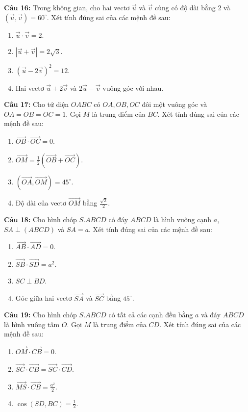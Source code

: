 \documentclass[12pt]{article}
\begin{document}
	\vspace{0.2cm}
	\noindent \textbf{Câu 16:} Trong không gian, cho hai vectơ $\vec{u}$ và $\vec{v}$ cùng có độ dài bằng $2$ và $(\vec{u}, \vec{v}) = 60^\circ$. Xét tính đúng sai của các mệnh đề sau:
	\begin{enumerate}[label=\alph*)]
		\item $\vec{u} \cdot \vec{v} = 2$.
		\item $|\vec{u} + \vec{v}| = 2\sqrt{3}$.
		\item $(\vec{u} - 2\vec{v})^2 = 12$.
		\item Hai vectơ $\vec{u} + 2\vec{v}$ và $2\vec{u} - \vec{v}$ vuông góc với nhau.
	\end{enumerate}
	
	\vspace{0.2cm}
	\noindent \textbf{Câu 17:} Cho tứ diện $OABC$ có $OA, OB, OC$ đôi một vuông góc và $OA = OB = OC = 1$. Gọi $M$ là trung điểm của $BC$. Xét tính đúng sai của các mệnh đề sau:
	\begin{enumerate}[label=\alph*)]
		\item $\overrightarrow{OB} \cdot \overrightarrow{OC} = 0$.
		\item $\overrightarrow{OM} = \frac{1}{2}(\overrightarrow{OB} + \overrightarrow{OC})$.
		\item $(\overrightarrow{OA}, \overrightarrow{OM}) = 45^\circ$.
		\item Độ dài của vectơ $\overrightarrow{OM}$ bằng $\frac{\sqrt{2}}{2}$.
	\end{enumerate}
	
	\vspace{0.2cm}
	\noindent \textbf{Câu 18:} Cho hình chóp $S.ABCD$ có đáy $ABCD$ là hình vuông cạnh $a$, $SA \perp (ABCD)$ và $SA = a$. Xét tính đúng sai của các mệnh đề sau:
	\begin{enumerate}[label=\alph*)]
		\item $\overrightarrow{AB} \cdot \overrightarrow{AD} = 0$.
		\item $\overrightarrow{SB} \cdot \overrightarrow{SD} = a^2$.
		\item $SC \perp BD$.
		\item Góc giữa hai vectơ $\overrightarrow{SA}$ và $\overrightarrow{SC}$ bằng $45^\circ$.
	\end{enumerate}
	
	\noindent \textbf{Câu 19:} Cho hình chóp $S.ABCD$ có tất cả các cạnh đều bằng $a$ và đáy $ABCD$ là hình vuông tâm $O$. Gọi $M$ là trung điểm của $CD$. Xét tính đúng sai của các mệnh đề sau:
	\begin{enumerate}[label=\alph*)]
		\item $\overrightarrow{OM} \cdot \overrightarrow{CB} = 0$.
		\item $\overrightarrow{SC} \cdot \overrightarrow{CB} = \overrightarrow{SC} \cdot \overrightarrow{CD}$.
		\item $\overrightarrow{MS} \cdot \overrightarrow{CB} = \frac{a^2}{2}$.
		\item $\cos(SD, BC) = \frac{1}{2}$.
	\end{enumerate}
	
\end{document}
